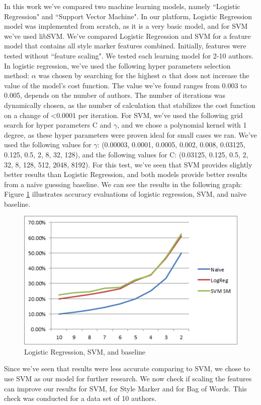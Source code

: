 \documentclass[a4paper]{article}
\begin{document}
In this work we've compared two machine learning models, namely ``Logistic Regression" and ``Support Vector Machine".
In our platform, Logistic Regression model was implemented from scratch, as it is a very basic model, and for SVM we've used libSVM\citep{chang}.
We've compared Logistic Regression and SVM for a feature model that contains all style marker features combined.
Initially, features were tested without ``feature scaling".
We tested each learning model for 2-10 authors.
In logistic regression, we've used the following hyper parameters selection method:
$\alpha$ was chosen by searching for the highest $\alpha$ that does not increase the value of the model's cost function. The value we've found ranges from 0.003 to 0.005, depends on the number of authors.
The number of iterations was dynamically chosen, as the number of calculation that stabilizes the cost function on a change of \textless 0.0001 per iteration.
For SVM, we've used the following grid search for hyper parameters C and $\gamma$, and we chose a polynomial kernel with 1 degree, as these hyper parameters were proven ideal for small cases we ran.
We've used the following values for $\gamma$: (0.00003, 0.0001, 0.0005, 0.002, 0.008, 0.03125, 0.125, 0.5, 2, 8, 32, 128), and the following values for C: (0.03125, 0.125, 0.5, 2, 32, 8, 128, 512, 2048, 8192).
For this test, we've seen that SVM provides slightly better results than Logistic Regression, and both models provide better results from a na\"ive guessing baseline. We can see the results in the following graph:
Figure \ref{fig:LR vs. SVM} illustrates accuracy evaluations of logistic regression, SVM, and na\"ive baseline.
\begin{figure}[!h]
	\centering
	\includegraphics[width=.5\textwidth]{"figures/lrvssvm"}
	\caption{Logistic Regression, SVM, and baseline}
		\label{fig:LR vs. SVM}
\end{figure}
Since we've seen that results were less accurate comparing to SVM, we chose to use SVM as our model for further research.
We now check if scaling the features can improve our results for SVM, for Style Marker and for Bag of Words.
This check was conducted for a data set of 10 authors.
\end{document}
